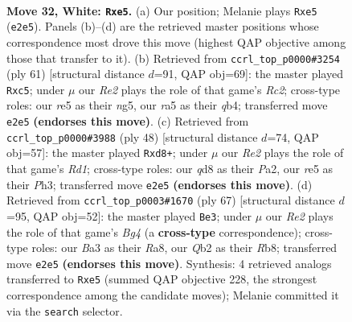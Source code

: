 \documentclass[11pt]{article}
\begin{document}
\clearpage

\begin{figure}[p]\centering
\begin{subfigure}{0.46\textwidth}\centering
\resizebox{\linewidth}{!}{%
\newchessgame
\chessboard[
  setfen={1nbq4/5p1k/1p1P1n2/r3r1pp/p1P5/B5PP/PQ2RP2/R5K1 w - - 0 32},
  showmover=false,
  pgfstyle=straightmove, color=movearrow, markmove={e2-e5}
]}
\caption{}
\end{subfigure}\hfill
\begin{subfigure}{0.46\textwidth}\centering
\resizebox{\linewidth}{!}{%
\newchessgame
\chessboard[
  setfen={1k1rb3/1pr1q3/4p1p1/2R1P1Np/pQ1p3P/P7/1P3PP1/2R3K1 b - - 0 31},
  showmover=false,
  pgfstyle=straightmove, color=movearrow, markmove={c7-c5}
]}
\caption{}
\end{subfigure}
\\[4pt]
\begin{subfigure}{0.46\textwidth}\centering
\resizebox{\linewidth}{!}{%
\newchessgame
\chessboard[
  setfen={1k1r2r1/ppn3q1/2p1p3/2P5/2P3pp/1Q2B2P/PP4P1/3RR2K w - - 0 25},
  showmover=false,
  pgfstyle=straightmove, color=movearrow, markmove={d1-d8}
]}
\caption{}
\end{subfigure}\hfill
\begin{subfigure}{0.46\textwidth}\centering
\resizebox{\linewidth}{!}{%
\newchessgame
\chessboard[
  setfen={rr6/4qpk1/p5p1/4p1b1/PPQ1N2p/5P1P/6P1/1R1R3K b - - 2 34},
  showmover=false,
  pgfstyle=straightmove, color=movearrow, markmove={g5-e3}
]}
\caption{}
\end{subfigure}
\caption{\textbf{Move 32, White: \texttt{Rxe5}.} (a) Our position; Melanie plays \texttt{Rxe5} (\texttt{e2e5}). Panels (b)--(d) are the retrieved master positions whose correspondence most drove this move (highest QAP objective among those that transfer to it). (b) Retrieved from \texttt{ccrl\_top\_p0000\#3254} (ply 61) [structural distance $d$=91, QAP obj=69]: the master played \texttt{Rxc5}; under $\mu$ our \emph{Re2} plays the role of that game's \emph{Rc2}; cross-type roles: our \emph{r}e5 as their \emph{n}g5, our \emph{r}a5 as their \emph{q}b4; transferred move \texttt{e2e5} \textbf{(endorses this move)}. (c) Retrieved from \texttt{ccrl\_top\_p0000\#3988} (ply 48) [structural distance $d$=74, QAP obj=57]: the master played \texttt{Rxd8+}; under $\mu$ our \emph{Re2} plays the role of that game's \emph{Rd1}; cross-type roles: our \emph{q}d8 as their \emph{P}a2, our \emph{r}e5 as their \emph{P}h3; transferred move \texttt{e2e5} \textbf{(endorses this move)}. (d) Retrieved from \texttt{ccrl\_top\_p0003\#1670} (ply 67) [structural distance $d$=95, QAP obj=52]: the master played \texttt{Be3}; under $\mu$ our \emph{Re2} plays the role of that game's \emph{Bg4} (a \textbf{cross-type} correspondence); cross-type roles: our \emph{B}a3 as their \emph{R}a8, our \emph{Q}b2 as their \emph{R}b8; transferred move \texttt{e2e5} \textbf{(endorses this move)}. Synthesis: 4 retrieved analogs transferred to \texttt{Rxe5} (summed QAP objective 228, the strongest correspondence among the candidate moves); Melanie committed it via the \texttt{search} selector.}
\label{fig:thought-m62}
\end{figure}
\end{document}

